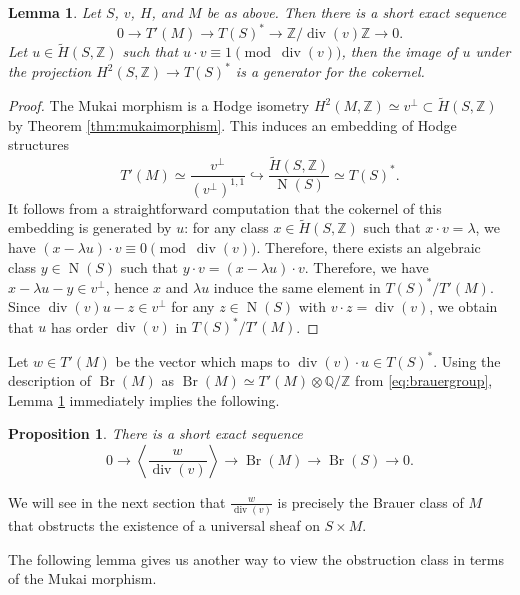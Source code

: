 \documentclass[11pt,twoside]{amsart}
\numberwithin{equation}{section}
\newtheorem{lemma}[dummy]{Lemma}
\newtheorem{proposition}[dummy]{Proposition}
\theoremstyle{definition}
\theoremstyle{plain}
\newcommand{\Z}{\ensuremath{\mathbb{Z}}}
\newcommand{\Q}{\ensuremath{\mathbb{Q}}}
\def\Br{\operatorname{Br}}
\def\N{\operatorname{N}}
\def\dv{\operatorname{div}}
\begin{document}
\begin{lemma}\label{lem:sestranscendental}
    Let $S$, $v$, $H$, and $M$ be as above. Then there is a short exact sequence 
    \begin{equation}
        0\to T'(M)\to T(S)^*\to \Z/\operatorname{div}(v)\Z\to 0.
    \end{equation}
    Let $u\in \tilde{H}(S,\Z)$ such that $u\cdot v \equiv 1\pmod{\dv(v)}$, then the image of $u$ under the projection $H^2(S,\Z)\to T(S)^*$ is a generator for the cokernel.
\end{lemma}
\begin{proof}
    The Mukai morphism is a Hodge isometry $H^2(M,\Z)\simeq v^\perp \subset \tilde{H}(S,\Z)$ by Theorem \ref{thm:mukaimorphism}. This induces an embedding of Hodge structures 
    \begin{equation}\label{eq:transcendentalembedding}
        T'(M) \simeq \frac{v^\perp}{(v^\perp)^{1,1}}\hookrightarrow \frac{\tilde{H}(S,\Z)}{\operatorname{N}(S)}\simeq T(S)^*.
    \end{equation}
    It follows from a straightforward computation that the cokernel of this embedding is generated by $u$: for any class $x\in\tilde{H}(S,\Z)$ such that $x\cdot v=\lambda$, we have $(x-\lambda u)\cdot v\equiv0\pmod{\dv(v)}$. Therefore, there exists an algebraic class $y\in \N(S)$ such that $y\cdot v = (x-\lambda u)\cdot v$. Therefore, we have $x-\lambda u - y \in v^\perp$, hence $x$ and $\lambda u$ induce the same element in $T(S)^*/T'(M)$. Since $\operatorname{div}(v)u-z\in v^\perp$ for any $z\in \N(S)$ with $v\cdot z=\operatorname{div}(v)$, we obtain that $u$ has order $\operatorname{div}(v)$ in $T(S)^*/T'(M)$.
\end{proof}
Let $w\in T'(M)$ be the vector which maps to $\dv(v)\cdot u\in T(S)^*$. Using the description of $\Br(M)$ as $\Br(M)\simeq T'(M)\otimes \Q/\Z$ from \eqref{eq:brauergroup}, Lemma \ref{lem:sestranscendental} immediately implies the following.

\begin{proposition} \label{prop:sesbrauerkn}
    There is a short exact sequence $$0\to \left\langle \frac{w}{\dv(v)}\right\rangle \to \Br(M)\to \Br(S)\to 0.$$
\end{proposition}

We will see in the next section that $\frac{w}{\dv(v)}$ is precisely the Brauer class of $M$ that obstructs the existence of a universal sheaf on $S\times M$.

The following lemma gives us another way to view the obstruction class in terms of the Mukai morphism.
\end{document}
